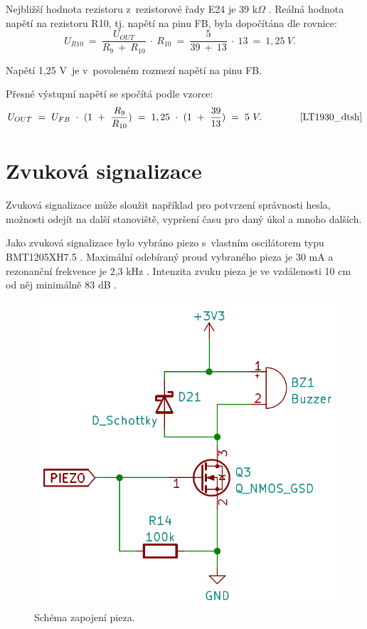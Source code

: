 Nejbližší hodnota rezistoru z~rezistorové řady E24 je 39 k$\Omega$ \cite{rezistorova_rada}. Reálná hodnota napětí na rezistoru R10, tj. napětí na pinu FB, byla dopočítána
dle rovnice:
\begin{equation} 
  U_{R10}~=~\frac{U_{OUT}}{R_{9}~+~R_{10}}~\cdot~R_{10}~=~\frac{5}{39~+~13}~\cdot~13~=~1,25~V. 
  \quad
\label{eq:UR10}
\end{equation}

Napětí 1,25 V~je v~povoleném rozmezí napětí na pinu FB. 

Přesné výstupní napětí se spočítá podle vzorce:
\begin{equation} 
  U_{OUT}~=~U_{FB}~\cdot~(1~+~\frac{R_{9}}{R_{10}})~=~1,25~\cdot~(1~+~\frac{39}{13})~=~5~V. 
  \quad \quad \quad \quad \cite{LT1930_dtsh}
\label{eq:VOUT_LT1930}
\end{equation}

\section{Zvuková signalizace}
Zvuková signalizace může sloužit například pro potvrzení správnosti hesla, možnosti odejít na další stanoviště, vypršení času pro daný úkol a mnoho dalších. 

Jako zvuková signalizace bylo vybráno piezo s~vlastním oscilátorem typu \\BMT1205XH7.5 \cite{piezo_dtsh}. Maximální odebíraný proud vybraného pieza je 30 mA a rezonanční frekvence 
je 2,3 kHz \cite{piezo_dtsh}. Intenzita zvuku pieza je ve vzdálenosti 10 cm od něj minimálně 83 dB \cite{piezo_dtsh}.

\begin{figure}[!h]
  \begin{center}
    \includegraphics[scale=0.45]{obrazky/piezo.png}
  \end{center}
  \caption[Schéma zapojení pieza]{Schéma zapojení pieza.}
\end{figure}

